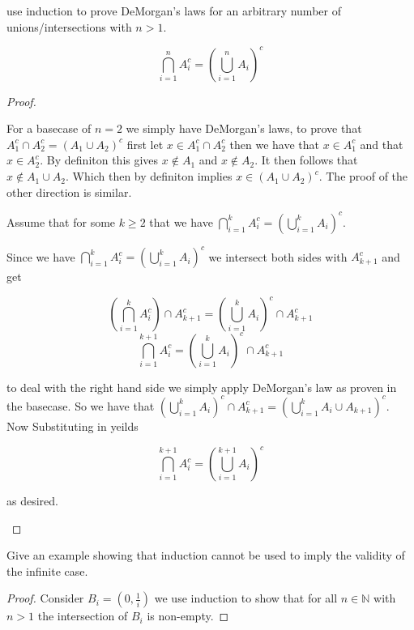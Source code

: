 \documentclass[11pt,largemargins]{homework}
\newcommand{\N}{\mathbb{N}}
\begin{document}
\begin{alphaparts}
    \questionpart
    use induction to prove DeMorgan's laws for an arbitrary number of unions/intersections with $n > 1$. 

    \[\bigcap_{i =1}^n A_i^c = \left(\bigcup_{i = 1}^n A_i \right)^c \]

    \begin{proof}
        \begin{induction}
            \basecase 
            For a basecase of $n = 2$ we simply have DeMorgan's laws, to prove that $A_1^c \cap A_2^c = (A_1 \cup A_2)^c$
            first let $x \in A_1^c \cap A_2^c$ then we have that $x \in A_1^c $ and that $x \in A_2^c$. By definiton this gives 
            $x \notin A_1$ and $x \notin A_2$. It then follows that $x \notin A_1 \cup A_2$. Which then by definiton implies
            $x \in (A_1 \cup A_2)^c $. The proof of the other direction is similar. 
            
            \indhyp
            Assume that for some $k \geq 2$ that we have $\bigcap_{i =1}^k A_i^c = \left(\bigcup_{i = 1}^k A_i \right)^c $.
            
            \indstep
            Since we have  $\bigcap_{i =1}^k A_i^c = \left(\bigcup_{i = 1}^k A_i \right)^c $ we intersect both sides with $A_{k + 1}^c$ and get 

            \[ \left( \bigcap_{i =1}^k A_i^c  \right) \cap A_{k+1}^c = \left(\bigcup_{i = 1}^k A_i \right)^c \cap A_{k+1}^c \] 
            \[\bigcap_{i =1}^{k+1} A_i^c = \left(\bigcup_{i = 1}^k A_i \right)^c \cap A_{k+1}^c \]

            to deal with the right hand side we simply apply DeMorgan's law as proven in the basecase. So we have that $\left(\bigcup_{i = 1}^k A_i \right)^c \cap A_{k+1}^c  = \left( \bigcup_{i = 1}^k A_i \cup A_{k+1} \right)^c$. Now Substituting in yeilds 

            \[\bigcap_{i =1}^{k+1} A_i^c = \left(\bigcup_{i = 1}^{k+1} A_i \right)^c \]

            as desired. 
            
        \end{induction}
    \end{proof}

    \questionpart
    Give an example showing that induction cannot be used to imply the validity of the infinite case.

    \begin{proof}
        Consider $B_i = (0, \frac{1}{i})$ we use induction to show that for all $n \in \N$ with $n > 1$ the intersection of $B_i$ is non-empty. 


\end{proof}
\end{alphaparts}
\end{document}
